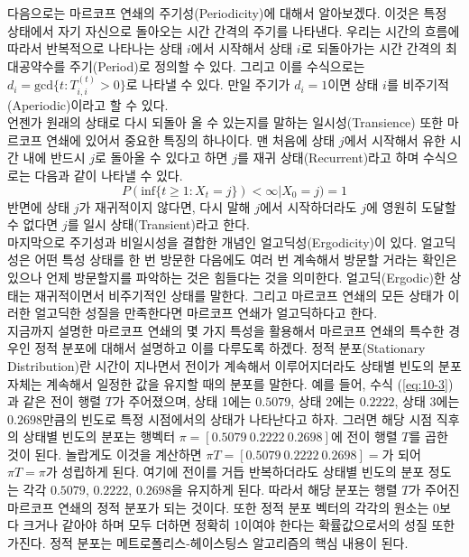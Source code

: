 \documentclass[a4paper]{oblivoir}
\begin{document}
다음으로는 마르코프 연쇄의 주기성(Periodicity)에 대해서 알아보겠다. 이것은 특정 상태에서 자기 자신으로 돌아오는 시간 간격의 주기를 나타낸다. 우리는 시간의 흐름에 따라서 반복적으로 나타나는 상태 $i$에서 시작해서 상태 $i$로 되돌아가는 시간 간격의 최대공약수를 주기(Period)로 정의할 수 있다. 그리고 이를 수식으로는 $d_{i}=\textrm{gcd} \{ t : T_{i,i}^{(t)}>0 \}$로 나타낼 수 있다. 만일 주기가 $d_{i}=1$이면 상태 $i$를 비주기적(Aperiodic)이라고 할 수 있다. \\  

언젠가 원래의 상태로 다시 되돌아 올 수 있는지를 말하는 일시성(Transience) 또한 마르코프 연쇄에 있어서 중요한 특징의 하나이다. 맨 처음에 상태 $j$에서 시작해서 유한 시간 내에 반드시 $j$로 돌아올 수 있다고 하면 $j$를 재귀 상태(Recurrent)라고 하며 수식으로는 다음과 같이 나타낼 수 있다. 
\begin{equation}
P(\textrm{inf} \{ t \geq 1 : X_{t} = j \}) < \infty | X_{0} = j) = 1
\label{eq:10-6}
\end{equation}
반면에 상태 $j$가 재귀적이지 않다면, 다시 말해 $j$에서 시작하더라도 $j$에 영원히 도달할 수 없다면 $j$를 일시 상태(Transient)라고 한다. \\

마지막으로 주기성과 비일시성을 결합한 개념인 얼고딕성(Ergodicity)이 있다. 얼고딕성은 어떤 특성 상태를 한 번 방문한 다음에도 여러 번 계속해서 방문할 거라는 확인은 있으나 언제 방문할지를 파악하는 것은 힘들다는 것을 의미한다. 얼고딕(Ergodic)한 상태는 재귀적이면서 비주기적인 상태를 말한다. 그리고 마르코프 연쇄의 모든 상태가 이러한 얼고딕한 성질을 만족한다면 마르코프 연쇄가 얼고딕하다고 한다. \\

지금까지 설명한 마르코프 연쇄의 몇 가지 특성을 활용해서 마르코프 연쇄의 특수한 경우인 정적 분포에 대해서 설명하고 이를 다루도록 하겠다. 정적 분포(Stationary Distribution)란 시간이 지나면서 전이가 계속해서 이루어지더라도 상태별 빈도의 분포 자체는 계속해서 일정한 값을 유지할 때의 분포를 말한다. 예를 들어, 수식 (\ref{eq:10-3})과 같은 전이 행렬 $T$가 주어졌으며, 상태 1에는 $0.5079$, 상태 2에는 $0.2222$, 상태 3에는 $0.2698$만큼의 빈도로 특정 시점에서의 상태가 나타난다고 하자. 그러면 해당 시점 직후의 상태별 빈도의 분포는 행벡터 $\pi = [0.5079 \ 0.2222 \ 0.2698]$에 전이 행렬 $T$를 곱한 것이 된다. 놀랍게도 이것을 계산하면 $\pi T = [0.5079 \ 0.2222 \ 0.2698]=$가 되어 $\pi T = \pi$가 성립하게 된다. 여기에 전이를 거듭 반복하더라도 상태별 빈도의 분포 정도는 각각 $0.5079$, $0.2222$, $0.2698$을 유지하게 된다. 따라서 해당 분포는 행렬 $T$가 주어진 마르코프 연쇄의 정적 분포가 되는 것이다. 또한 정적 분포 벡터의 각각의 원소는 0보다 크거나 같아야 하며 모두 더하면 정확히 1이여야 한다는 확률값으로서의 성질 또한 가진다. 정적 분포는 메트로폴리스-헤이스팅스 알고리즘의 핵심 내용이 된다. \\ 
\end{document}
